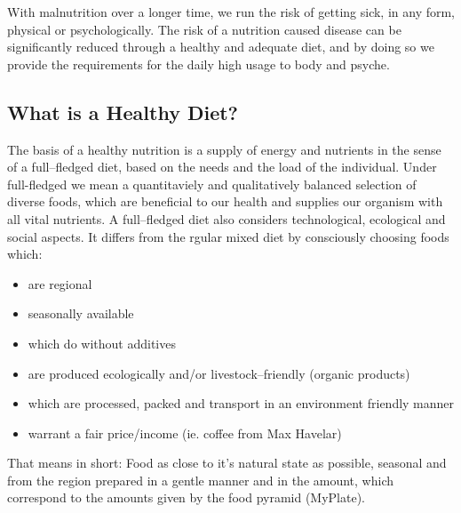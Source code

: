 \documentclass[../main.tex]{subfiles}
\begin{document}
With malnutrition over a longer time, we run the risk of getting sick, in any form, physical or psychologically.
The risk of a nutrition caused disease can be significantly reduced through a  healthy and adequate diet,
and by doing so we provide the requirements for the daily high usage to body and psyche.

\subsection{What is a Healthy Diet?}

The basis of a healthy nutrition is a supply of energy and nutrients in the sense of a full--fledged diet,
based on the needs and the load of the individual.
Under full-fledged we mean a quantitaviely and qualitatively balanced selection of diverse foods,
which are beneficial to our health and supplies our organism with all vital nutrients.
A full--fledged diet also considers technological, ecological and social aspects.
It differs from the rgular mixed diet by consciously choosing foods which:
\begin{itemize}
\item are regional
\item seasonally available
\item which do without additives
\item are produced ecologically and/or livestock--friendly (organic products)
\item which are processed, packed and transport in an environment friendly manner
  \item warrant a fair price/income (ie. coffee from Max Havelar)
  \end{itemize}

  That means in short: Food as close to it's natural state as possible, seasonal and from the region
  prepared in a gentle manner and in the amount, which correspond to the amounts given by the food pyramid (MyPlate).
  
\end{document}
